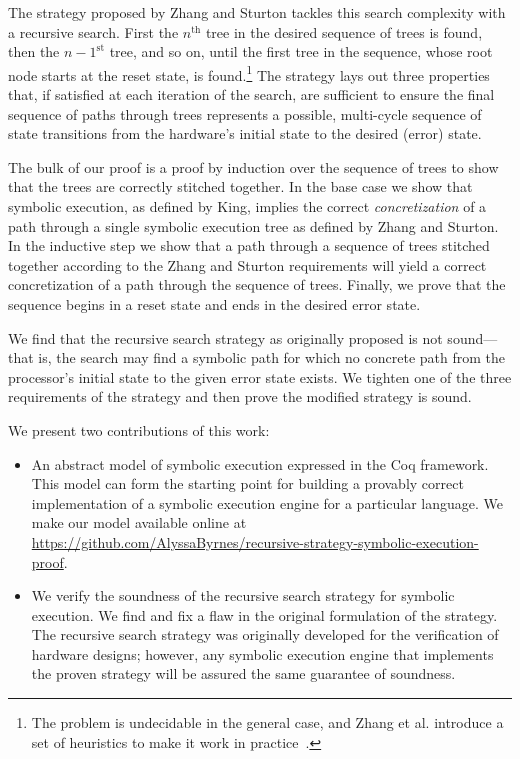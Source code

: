 The strategy proposed by Zhang and Sturton tackles this search complexity with a
recursive search. First the $n^{\mathrm{th}}$ tree in the desired sequence of
trees is found, then the $n-1^{\mathrm{st}}$ tree, and so on, until the first
tree in the sequence, whose root node starts at the reset state, is
found.\footnote{The problem is undecidable in the general case, and Zhang et
  al. introduce a set of heuristics to make it work in
  practice~\cite{zhang2018end}.} The strategy lays out three properties that, if
satisfied at each iteration of the search, are sufficient to ensure the final
sequence of paths through trees represents a possible, multi-cycle sequence of
state transitions from the hardware's initial state to the desired (error)
state.

The bulk of our proof is a proof by induction over the sequence of trees to show
that the trees are correctly stitched together. In the base case we show that
symbolic
execution, as defined by King, implies the correct \emph{concretization} of a path through a
single symbolic execution tree as defined by Zhang and Sturton. In the inductive
step we show that a path through a sequence of trees stitched together according
to the Zhang and Sturton requirements will yield a correct concretization of a
path through the sequence of trees. Finally, we prove that the sequence begins in a reset state and ends in the
desired error state.

We find that the recursive search strategy as originally proposed is not sound---that is, the
search may find a symbolic path for which no concrete path from the processor's initial state
to the given error state exists. We tighten one of the three
requirements of the strategy and then prove the modified strategy is sound.

We present two contributions of this work:
\begin{itemize}
  \item An abstract model of symbolic execution expressed in the Coq
    framework. This model can form the starting point for 
    building a provably correct implementation of a symbolic execution engine for a
    particular language. We make our model available online at \\
    \url{https://github.com/AlyssaByrnes/recursive-strategy-symbolic-execution-proof}.
    
\item We verify the soundness of the recursive search strategy for symbolic
  execution. We find and fix a flaw in the original formulation of the
  strategy. The recursive search strategy was originally developed for
  the verification of hardware designs; however, any symbolic execution engine that
  implements the proven strategy will be assured the same guarantee of soundness.
\end{itemize}
